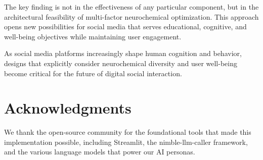 \documentclass{article}
\begin{document}
The key finding is not in the effectiveness of any particular component, but in the architectural feasibility of multi-factor neurochemical optimization. This approach opens new possibilities for social media that serves educational, cognitive, and well-being objectives while maintaining user engagement.

As social media platforms increasingly shape human cognition and behavior, designs that explicitly consider neurochemical diversity and user well-being become critical for the future of digital social interaction.

\section{Acknowledgments}

We thank the open-source community for the foundational tools that made this implementation possible, including Streamlit, the nimble-llm-caller framework, and the various language models that power our AI personas.



\end{document}

